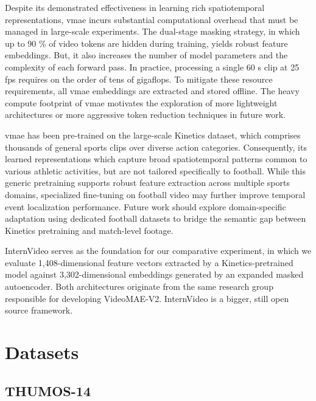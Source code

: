 Despite its demonstrated effectiveness in learning rich spatiotemporal representations, \acrlong{vmae} incurs substantial computational overhead that must be managed in large-scale experiments. The dual-stage masking strategy, in which up to 90 \% of video tokens are hidden during training, yields robust feature embeddings. But, it also increases the number of model parameters and the complexity of each forward pass. In practice, processing a single 60 s clip at 25 fps requires on the order of tens of gigaflops\cite{wang_videomae_2023}. To mitigate these resource requirements, all \acrlong{vmae} embeddings are extracted and stored offline. The heavy compute footprint of \acrlong{vmae} motivates the exploration of more lightweight architectures or more aggressive token reduction techniques in future work. 

\acrlong{vmae} has been pre-trained on the large-scale Kinetics dataset, which comprises thousands of general sports clips over diverse action categories. Consequently, its learned representations which capture broad spatiotemporal patterns common to various athletic activities, but are not tailored specifically to football. While this generic pretraining supports robust feature extraction across multiple sports domains, specialized fine-tuning on football video may further improve temporal event localization performance. Future work should explore domain-specific adaptation using dedicated football datasets to bridge the semantic gap between Kinetics pretraining and match-level footage. 

InternVideo serves as the foundation for our comparative experiment, in which we evaluate 1,408-dimensional feature vectors extracted by a Kinetics-pretrained model against 3,302-dimensional embeddings generated by an expanded masked autoencoder. Both architectures originate from the same research group responsible for developing VideoMAE-V2. InternVideo is a bigger, still open source framework.


\section{Datasets}
\label{sec:method_datasets}

\subsection{THUMOS-14}

